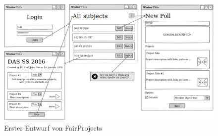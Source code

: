 \begin{figure}[t]
	\centering
	\includegraphics[width=1\linewidth]{figures/fairprojectsFirstDraft.png}
	\caption{Erster Entwurf von FairProjects}
	\label{f:fallstudie:firstdraft}
\end{figure}